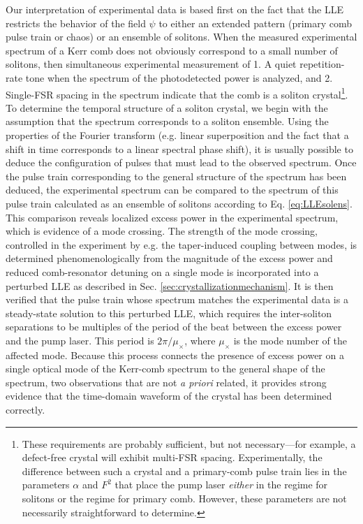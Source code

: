 Our interpretation of experimental data is based first on the fact that the LLE restricts the behavior of the field $\psi$ to either an extended pattern (primary comb pulse train or chaos) or an ensemble of solitons. When the measured experimental spectrum of a Kerr comb does not obviously correspond to a small number of solitons, then simultaneous experimental measurement of 1. A quiet repetition-rate tone when the spectrum of the photodetected power is analyzed, and 2. Single-FSR spacing in the spectrum indicate that the comb is a soliton crystal\footnote{These requirements are probably sufficient, but not necessary---for example, a defect-free crystal will exhibit multi-FSR spacing. Experimentally, the difference between such a crystal and a primary-comb pulse train lies in the parameters $\alpha$ and $F^2$ that place the pump laser \textit{either} in the regime for solitons or the regime for primary comb. However, these parameters are not necessarily straightforward to determine.}. To determine the temporal structure of a soliton crystal, we begin with the assumption that the spectrum corresponds to a soliton ensemble. Using the properties of the Fourier transform (e.g. linear superposition and the fact that a shift in time corresponds to a linear spectral phase shift), it is usually possible to deduce the configuration of pulses that must lead to the observed spectrum. Once the pulse train corresponding to the general structure of the spectrum has been deduced, the experimental spectrum can be compared to the spectrum of this pulse train calculated as an ensemble of solitons according to Eq. \ref{eq:LLEsolens}. This comparison reveals localized excess power in the experimental spectrum, which is evidence of a mode crossing. The strength of the mode crossing, controlled in the experiment by e.g. the taper-induced coupling between modes, is determined phenomenologically from the magnitude of the excess power and reduced comb-resonator detuning on a single mode is incorporated into a perturbed LLE as described in Sec. \ref{sec:crystallizationmechanism}. It is then verified that the pulse train whose spectrum matches the experimental data is a steady-state solution to this perturbed LLE, which requires the inter-soliton separations to be multiples of the period of the beat between the excess power and the pump laser. This period is $2\pi /\mu_\times$, where $\mu_\times$ is the mode number of the affected mode. Because this process connects the presence of excess power on a single optical mode of the Kerr-comb spectrum to the general shape of the spectrum, two observations that are not \textit{a priori} related, it provides strong evidence that the time-domain waveform of the crystal has been determined correctly.

